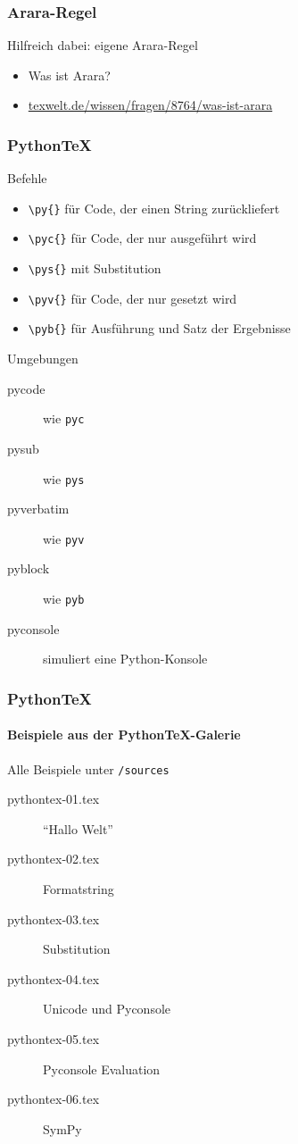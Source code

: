 \documentclass[12pt,ngerman]{beamer}
\begin{document}
\begin{frame}[fragile]
\frametitle{Arara-Regel}

Hilfreich dabei: eigene Arara-Regel

\begin{itemize}
	\item Was ist Arara?
	\item \url{texwelt.de/wissen/fragen/8764/was-ist-arara}
\end{itemize}

 
\end{frame}


\begin{frame}[fragile]
\frametitle{Python\TeX}

Befehle

\begin{itemize}
\item \verb|\py{}|  für Code, der einen String zurückliefert
\item \verb|\pyc{}|  für Code, der nur ausgeführt wird
\item \verb|\pys{}|  mit Substitution
\item \verb|\pyv{}|  für Code, der nur gesetzt wird
\item \verb|\pyb{}|  für Ausführung und Satz der Ergebnisse
\end{itemize}

Umgebungen

\begin{description}
\item[pycode] wie \texttt{pyc}
\item[pysub] wie \texttt{pys}
\item[pyverbatim] wie \texttt{pyv}
\item[pyblock] wie \texttt{pyb}
\item[pyconsole] simuliert eine Python-Konsole
\end{description}

\end{frame}

\begin{frame}
\frametitle{Python\TeX}
\framesubtitle{Beispiele aus der Python\TeX-Galerie}

Alle Beispiele unter \texttt{/sources}

\begin{description}
\item[pythontex-01.tex] \enquote{Hallo Welt}
\item[pythontex-02.tex] Formatstring
\item[pythontex-03.tex] Substitution
\item[pythontex-04.tex] Unicode und Pyconsole
\item[pythontex-05.tex] Pyconsole Evaluation
\item[pythontex-06.tex] SymPy
\end{description}

\end{frame}
\end{document}
